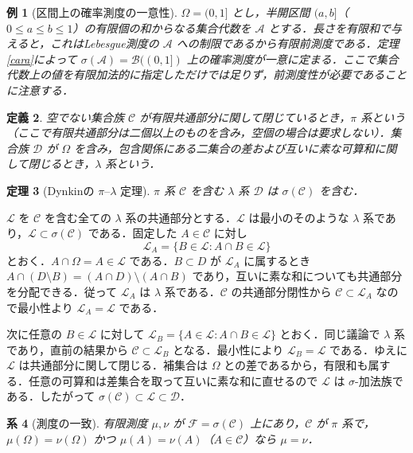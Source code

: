 \documentclass[a5paper,10pt,onecolumn]{jsarticle}
\makeatletter
\theoremstyle{mathnotetheorem}
\newtheorem{theorem}{定理}[section]
\newtheorem{definition}[theorem]{定義}
\newtheorem{corollary}[theorem]{系}
\newtheorem{example}[theorem]{例}
\renewcommand{\proofname}{証明}
\renewenvironment{proof}[1][\proofname]{%
  \par\pushQED{\qed}\normalfont\topsep4\p@\@plus2\p@\relax
  \trivlist\item[\hskip\labelsep\bfseries #1]\ignorespaces
}{\popQED\endtrivlist\@endpefalse}
\newcommand{\F}{\mathcal F}
\newcommand{\B}{\mathcal B}
\newcommand{\1}{\mathbf{1}}
\makeatother
\begin{document}
\begin{example}[区間上の確率測度の一意性]
$\Omega=(0,1]$ とし，半開区間 $(a,b]$（$0\le a\le b\le1$）の有限個の和からなる集合代数を $\mathcal A$ とする．長さを有限和で与えると，これはLebesgue測度の $\mathcal A$ への制限であるから有限前測度である．定理\ref{cara}によって $\sigma(\mathcal A)=\B((0,1])$ 上の確率測度が一意に定まる．ここで集合代数上の値を有限加法的に指定しただけでは足りず，前測度性が必要であることに注意する．
\end{example}
\begin{definition}
空でない集合族 $\mathcal C$ が有限共通部分に関して閉じているとき，$\pi$ 系という（ここで有限共通部分は二個以上のものを含み，空個の場合は要求しない）．集合族 $\mathcal D$ が $\Omega$ を含み，包含関係にある二集合の差および互いに素な可算和に関して閉じるとき，$\lambda$ 系という．
\end{definition}
\begin{theorem}[Dynkinの $\pi$--$\lambda$ 定理]\label{pilambda}
$\pi$ 系 $\mathcal C$ を含む $\lambda$ 系 $\mathcal D$ は $\sigma(\mathcal C)$ を含む．
\end{theorem}
\begin{proof}
$\mathcal L$ を $\mathcal C$ を含む全ての $\lambda$ 系の共通部分とする．$\mathcal L$ は最小のそのような $\lambda$ 系であり，$\mathcal L\subset\sigma(\mathcal C)$ である．固定した $A\in\mathcal C$ に対し
\[
 \mathcal L_A=\{B\in\mathcal L:A\cap B\in\mathcal L\}
\]
とおく．$A\cap\Omega=A\in\mathcal L$ である．$B\subset D$ が $\mathcal L_A$ に属するとき $A\cap(D\setminus B)=(A\cap D)\setminus(A\cap B)$ であり，互いに素な和についても共通部分を分配できる．従って $\mathcal L_A$ は $\lambda$ 系である．$\mathcal C$ の共通部分閉性から $\mathcal C\subset\mathcal L_A$ なので最小性より $\mathcal L_A=\mathcal L$ である．

次に任意の $B\in\mathcal L$ に対して $\mathcal L_B=\{A\in\mathcal L:A\cap B\in\mathcal L\}$ とおく．同じ議論で $\lambda$ 系であり，直前の結果から $\mathcal C\subset\mathcal L_B$ となる．最小性により $\mathcal L_B=\mathcal L$ である．ゆえに $\mathcal L$ は共通部分に関して閉じる．補集合は $\Omega$ との差であるから，有限和も属する．任意の可算和は差集合を取って互いに素な和に直せるので $\mathcal L$ は $\sigma$-加法族である．したがって $\sigma(\mathcal C)\subset\mathcal L\subset\mathcal D$．
\end{proof}
\begin{corollary}[測度の一致]\label{unique}
有限測度 $\mu,\nu$ が $\F=\sigma(\mathcal C)$ 上にあり，$\mathcal C$ が $\pi$ 系で，$\mu(\Omega)=\nu(\Omega)$ かつ $\mu(A)=\nu(A)$（$A\in\mathcal C$）なら $\mu=\nu$．
\end{corollary}
\end{document}
